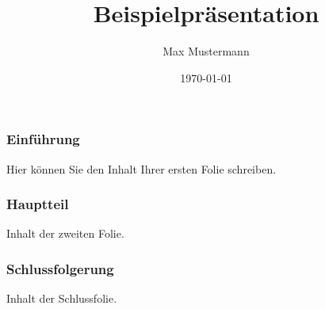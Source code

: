 \documentclass{beamer}
\title{Beispielpräsentation}
\author{Max Mustermann}
\institute{Musteruniversität}
\date{\today}
\begin{document}
	
	\begin{frame}
		\titlepage
	\end{frame}
	
	\begin{frame}
		\frametitle{Einführung}
		Hier können Sie den Inhalt Ihrer ersten Folie schreiben.
	\end{frame}
	
	\begin{frame}
		\frametitle{Hauptteil}
		Inhalt der zweiten Folie.
	\end{frame}
	
	\begin{frame}
		\frametitle{Schlussfolgerung}
		Inhalt der Schlussfolie.
	\end{frame}
	
\end{document}
